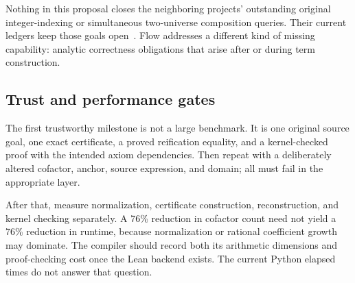 Nothing in this proposal closes the neighboring projects' outstanding original integer-indexing or simultaneous two-universe composition queries. Their current ledgers keep those goals open~\cite{leant,djex}. Flow addresses a different kind of missing capability: analytic correctness obligations that arise after or during term construction.

\subsection{Trust and performance gates}

The first trustworthy milestone is not a large benchmark. It is one original source goal, one exact certificate, a proved reification equality, and a kernel-checked proof with the intended axiom dependencies. Then repeat with a deliberately altered cofactor, anchor, source expression, and domain; all must fail in the appropriate layer.

After that, measure normalization, certificate construction, reconstruction, and kernel checking separately. A 76\% reduction in cofactor count need not yield a 76\% reduction in runtime, because normalization or rational coefficient growth may dominate. The compiler should record both its arithmetic dimensions and proof-checking cost once the Lean backend exists. The current Python elapsed times do not answer that question.
